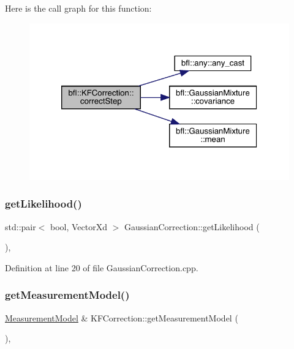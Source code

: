 Here is the call graph for this function\+:
\nopagebreak
\begin{figure}[H]
\begin{center}
\leavevmode
\includegraphics[width=320pt]{classbfl_1_1KFCorrection_ac97f8001212bd43071a1e4f2f7fe649d_cgraph}
\end{center}
\end{figure}
\mbox{\label{classbfl_1_1GaussianCorrection_a955702adbdad6448d8f306752d3d0868}} 
\subsubsection{\texorpdfstring{get\+Likelihood()}{getLikelihood()}}
{\footnotesize\ttfamily std\+::pair$<$ bool, Vector\+Xd $>$ Gaussian\+Correction\+::get\+Likelihood (\begin{DoxyParamCaption}{ }\end{DoxyParamCaption})\hspace{0.3cm}{\ttfamily [virtual]}, {\ttfamily [inherited]}}



Definition at line 20 of file Gaussian\+Correction.\+cpp.

\mbox{\label{classbfl_1_1KFCorrection_a71faf84180752e4e31b4eaa5db1c18d1}} 
\subsubsection{\texorpdfstring{get\+Measurement\+Model()}{getMeasurementModel()}}
{\footnotesize\ttfamily \mbox{\hyperlink{classbfl_1_1MeasurementModel}{Measurement\+Model}} \& K\+F\+Correction\+::get\+Measurement\+Model (\begin{DoxyParamCaption}{ }\end{DoxyParamCaption})\hspace{0.3cm}{\ttfamily [override]}, {\ttfamily [virtual]}}



